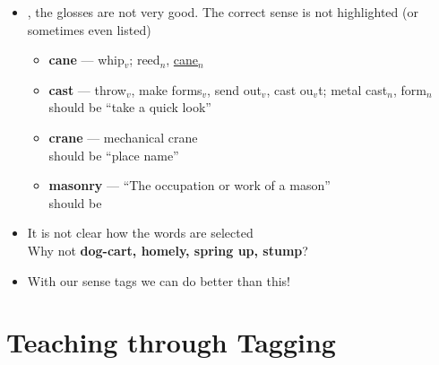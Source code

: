 \documentclass[a4paper,landscape,headrule,footrule,xetex]{foils}
\begin{document}
\begin{itemize}
\item {}, the glosses are not very good.  The correct sense is not
  highlighted (or sometimes even listed)
    \begin{itemize}
    \item \textbf{cane} --- whip$_v$; reed$_n$, \ul{cane$_n$}
    \item \textbf{cast} ---  throw$_v$, make forms$_v$, send out$_v$,
      cast ou$_v$t; metal cast$_n$, form$_n$
      \\ should be  ``take a quick look''
    \item \textbf{crane} --- mechanical crane
      \\ should be  ``place name''
    \item \textbf{masonry} --- ``The occupation or work of a mason''
      \\ should be 
  \end{itemize}
\item It is not clear how the words are selected
\\ Why not \textbf{dog-cart, homely, spring up, stump}?
\item With our sense tags we can do better than this!
\end{itemize}



\section{Teaching through Tagging}

\end{document}
